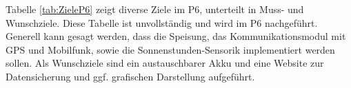 \begin{landscape}
\noindent
Tabelle \ref{tab:ZieleP6} zeigt diverse Ziele im P6, unterteilt in Muss- und Wunschziele. Diese Tabelle ist unvollständig und wird im P6 nachgeführt. Generell kann gesagt werden, dass die Speisung, das Kommunikationsmodul mit GPS und Mobilfunk, sowie die Sonnenstunden-Sensorik implementiert werden sollen. Als Wunschziele sind ein austauschbarer Akku und eine Website zur Datensicherung und ggf. grafischen Darstellung aufgeführt.
\end{landscape}
